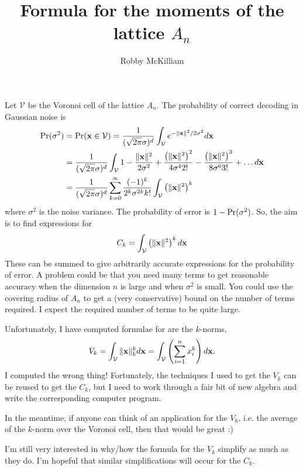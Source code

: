 \documentclass[a4paper,10pt]{article}
\title{Formula for the moments of the lattice $A_n$}
\author{Robby McKilliam}
\begin{document}
\newcommand{\calR}{\mathcal{R}}
\newcommand{\calV}{\mathcal{V}}

Let $\calV$ be the Voronoi cell of the lattice $A_n$.  The probability of correct decoding in Gaussian noise is
\begin{align*}
\prob(\sigma^2) &= \prob( \xbf \in \calV ) = \frac{1}{(\sqrt{2\pi}\sigma)^d}\int_\calV e^{-\|\xbf\|^2 / 2\sigma^2} d\xbf \\
&= \frac{1}{(\sqrt{2\pi}\sigma)^d}\int_\calV 1 - \frac{\|\xbf\|^2}{2\sigma^2} + \frac{\left(\|\xbf\|^2\right)^2}{ 4\sigma^42!} - \frac{\left(\|\xbf\|^2\right)^3}{ 8\sigma^63!} + \dots d\xbf \\
&= \frac{1}{(\sqrt{2\pi}\sigma)^d} \sum_{k=0}^\infty \frac{(-1)^k}{2^k\sigma^{2k}k!} \int_\calV \left(\|\xbf\|^2\right)^k
\end{align*}
where $\sigma^2$ is the noise variance.  The probability of error is $1 - \operatorname{Pr}(\sigma^2)$.  So, the aim is to find expressions for
\[
 C_k = \int_\calV \left(\|\xbf\|^2\right)^k d\xbf
\]
These can be summed to give arbitrarily accurate expressions for the probability of error.  A problem could be that you need many terms to get reasonable accuracy when the dimension $n$ is large and when $\sigma^2$ is small.  You could use the covering radius of $A_n$ to get a (very conservative) bound on the number of terms required.  I expect the required number of terms to be quite large.  %



Unfortunately, I have computed formulae for are the $k$-norms,
\[
V_k = \int_\calV \|\xbf\|_k^k d\xbf = \int_\calV \left(\sum_{i=1}^{n}x_i^k\right) d\xbf.
\]
I computed the wrong thing!  Fortunately, the techniques I used to get the $V_k$ can be reused to get the $C_k$, but I need to work through a fair bit of new algebra and write the corresponding computer program.

In the meantime, if anyone can think of an application for the $V_k$, i.e. the average of the $k$-norm over the Voronoi cell, then that would be great :)

I'm still very interested in why/how the formula for the $V_k$ simplify as much as they do.  I'm hopeful that similar simplifications will occur for the $C_k$.

%
\end{document}
